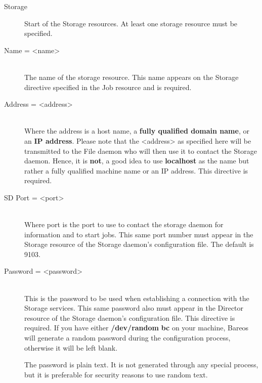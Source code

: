 

\begin{description}

\item [Storage]
Start of the Storage resources. At least one  storage resource must be
specified.

\item [Name = {\textless}name{\textgreater}] \hfill \\
The name of the storage resource. This  name appears on the Storage directive
specified in the Job resource and is required.

\item [Address = {\textless}address{\textgreater}] \hfill \\
Where the address is a host name,  a {\bf fully qualified domain name}, or an
{\bf IP address}. Please note  that the {\textless}address{\textgreater} as specified here
will be transmitted to  the File daemon who will then use it to contact the
Storage daemon. Hence,  it is {\bf not}, a good idea to use {\bf localhost} as
the  name but rather a fully qualified machine name or an IP address.  This
directive is required.

\item [SD Port = {\textless}port{\textgreater}] \hfill \\
Where port is the port to use to  contact the storage daemon for information
and to start jobs.  This same port number must appear in the Storage resource
of the  Storage daemon's configuration file. The default is 9103.

\item [Password = {\textless}password{\textgreater}] \hfill \\
This is the password to be used  when establishing a connection with the
Storage services. This  same password also must appear in the Director
resource of the Storage  daemon's configuration file. This directive is
required.  If you have either {\bf /dev/random}  {\bf bc} on your machine,
Bareos will generate a random  password during the configuration process,
otherwise it will  be left blank.

The password is plain text.  It is not generated through any special
process, but it is preferable for security reasons to use random text.


\end{description}
